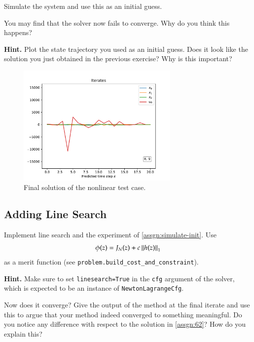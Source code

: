 \documentclass[]{article}
\begin{document}
\begin{assignment} \label{assgn:simulate-init}
   Simulate the system and use this as an initial guess.

   You may find that the solver now fails to converge. 
   Why do you think this happens? 
   
   \textbf{Hint.} Plot the state trajectory you used as an initial guess. 
   Does it look like the solution you just obtained in the previous exercise? 
   Why is this important?
\end{assignment}
\begin{figure}[H]
	\centering
	\includegraphics[width=0.7\textwidth]{images/Assignment6-3.pdf}
	\caption{Final solution of the nonlinear test case.}
	\label{fig:assignment6_3}
\end{figure}



\subsection{Adding Line Search}

\begin{assignment}
   Implement line search and the experiment of \cref{assgn:simulate-init}. 
   Use 
	\[ 
		\phi(z) = J_N(z) + c \left\|h(z)\right\|_1 
	\]
	as a merit function (see \texttt{problem.build\_cost\_and\_constraint}). 

	\textbf{Hint.} Make sure to set \texttt{linesearch=True} in the \texttt{cfg} argument of the solver, 
	which is expected to be an instance of \texttt{NewtonLagrangeCfg}.
	
   Now does it converge? Give the output of the method at the final iterate and use this 
   to argue that your method indeed converged to something meaningful. 
   Do you notice any difference with respect to the solution in \cref{assgn:62}? 
   How do you explain this?
\end{assignment}
\end{document}
